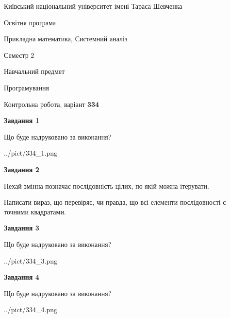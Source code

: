 \documentclass[12pt, ukrainian]{article}
\begin{document}
{{\begin {small}\par
{ \center  Київський національний університет імені Тараса Шевченка \par}
{\parbox {5 cm}{Освітня програма \hfill}{\parbox {8 cm}{Прикладна математика, Системний аналіз \hfill}}\parbox {5 cm}{\hfill Семестр 2}}\par
{\parbox {5 cm} {Навчальний предмет \hfill}\parbox {7 cm}{Програмування \hfill}\parbox {6cm}{\hfill}\par}\vspace{-7pt} \end{small}}{\center Контрольна робота, варіант  \No \textbf
{ 334 }\par}}
{
\begin {large}
{\begin {center}\textbf{Завдання 1}\end {center}}\par
Що буде надруковано за виконання?\par\par
\begin{center}
	{../pict/334_1.png}
\end{center}
\newpage

{\begin {center}\textbf{Завдання 2}\end {center}}\par
Нехай змінна  позначає послідовність цілих, по якій можна ітерувати.

Написати вираз, що перевіряє, чи правда, що всі елементи послідовності є точними квадратами.\par
\newpage

{\begin {center}\textbf{Завдання 3}\end {center}}\par
Що буде надруковано за виконання?\par
\begin{center}
	{../pict/334_3.png}
\end{center}
\newpage

{\begin {center}\textbf{Завдання 4}\end {center}}\par
Що буде надруковано за виконання?\par
\begin{center}
	{../pict/334_4.png}
\end{center}
\newpage


\end{large}}
\end{document}
